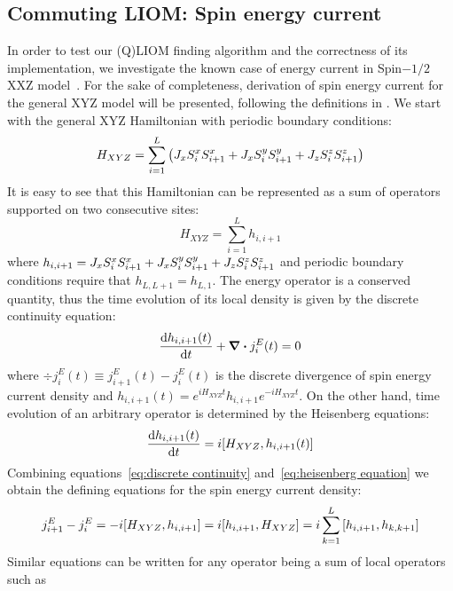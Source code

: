 \subsection{Commuting LIOM: Spin energy current}
In order to test our (Q)LIOM finding algorithm and the correctness of its implementation, we investigate the known case of
energy current in Spin\(-1/2\) XXZ model~\autocite*{Mierzejewski2015Approx}. For the sake of completeness, derivation of
spin energy current for the general XYZ model will be presented, following the definitions in \textcite{Zotos1997}.
We start with the general XYZ Hamiltonian with periodic boundary conditions:
\begin{equation}
  H_{XYZ} = \sum_{i=1}^L  \left( J_{x} S^{x}_{i}S^{x}_{i+1} + J_{x} S^{y}_{i}S^{y}_{i+1} + J_{z} S^{z}_{i}S^{z}_{i+1} \right)
\end{equation}
It is easy to see that this Hamiltonian can be represented as a sum of operators supported on two consecutive sites:
\begin{equation}
  H_{XYZ} = \sum_{i=1}^L h_{i,i+1}
\end{equation}
where \(h_{i,i+1} = J_{x} S^{x}_{i}S^{x}_{i+1} + J_{x} S^{y}_{i}S^{y}_{i+1} + J_{z} S^{z}_{i}S^{z}_{i+1} \) and periodic boundary conditions
require that \(h_{L,L+1} = h_{L,1}\). The energy operator is a conserved quantity, thus the time evolution of its local density
is given by the discrete continuity equation:
\begin{equation}
  \dv{h_{i,i+1}(t)}{t} + \div{j_{i}^{E}(t)} = 0
  \label{eq:discrete continuity}
\end{equation}
where \(\div{j_{i}^E(t)} \equiv j_{i+1}^E(t) - j_{i}^E(t)\) is the discrete divergence of spin energy current density and \(h_{i,i+1}(t) = e^{i H_{XYZ}t} h_{i,i+1} e^{-i H_{XYZ} t}\).
On the other hand, time evolution of an arbitrary operator is determined
by the Heisenberg equations:
\begin{equation}
  \dv{h_{i,i+1}(t)}{t} = i \comm{H_{XYZ}}{h_{i,i+1}(t)}
  \label{eq:heisenberg equation}
\end{equation}
Combining equations~\eqref{eq:discrete continuity} and~\eqref{eq:heisenberg equation} we obtain the defining equations for
the spin energy current density:
\begin{equation}
  j_{i+1}^E - j_{i}^E = - i \comm{H_{XYZ}}{h_{i,i+1}} = i \comm{h_{i,i+1}}{H_{XYZ}} = i \sum_{k=1}^L \comm{h_{i,i+1}}{h_{k,k+1}}
  \label{eq:energy current defining equation}
\end{equation}
Similar equations can be written for any operator being a sum of local operators such as
